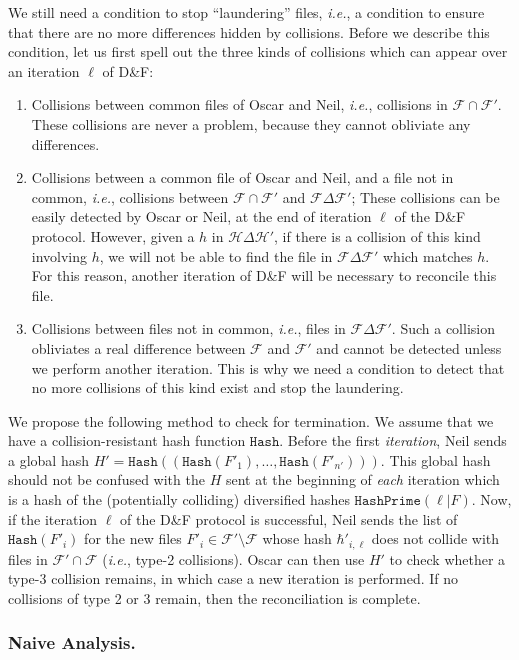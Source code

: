 \documentclass[11pt]{llncs}
\newcommand{\Set}{\mathcal{H}}
\newcommand{\Files}{\mathcal{F}}
\newcommand{\df}{D\&F\xspace}
\newcommand{\ie}{\textit{i.e.}\xspace}
\newcommand{\Hash}{\ensuremath{\mathtt{Hash}}}
\newcommand{\HashPrime}{\ensuremath{\mathtt{HashPrime}}}
\begin{document}
We still need a condition to stop ``laundering'' files, \ie, a condition to ensure that there are no more differences hidden by collisions.
Before we describe this condition, let us first spell out the three kinds of collisions which can appear over an iteration $\ell$ of \df:

\begin{enumerate}
\item Collisions between common files of Oscar and Neil, \ie, collisions in $\Files \cap \Files'$. These collisions are never a problem, because they cannot obliviate any differences.
\item Collisions between a common file of Oscar and Neil, and a file not in common, \ie, collisions between $\Files \cap \Files'$ and $\Files \Delta \Files'$;
These collisions can be easily detected by Oscar or Neil, at the end of iteration $\ell$ of the \df protocol. 
However, given a $h$ in $\Set \Delta \Set'$, if there is a collision of this kind involving $h$, we will not be able to find the file in $\Files \Delta \Files'$ which matches $h$. For this reason, another iteration of \df will be necessary to reconcile this file.
\item Collisions between files not in common, \ie, files in $\Files \Delta \Files'$.
  Such a collision obliviates a real difference between $\Files$ and $\Files'$ and cannot be detected unless we perform another iteration. This is why we need a condition to detect that no more collisions of this kind exist and stop the laundering.
\end{enumerate}

We propose the following method to check for termination. We assume that we have a collision-resistant hash function $\Hash$.
Before the first \emph{iteration}, Neil sends a global hash $H' = \Hash((\Hash(F'_1),\dots,\Hash(F'_{n'})))$.
This global hash should not be confused with the $H$ sent at the beginning of \emph{each} iteration which is a hash of the (potentially colliding) diversified hashes $ \HashPrime(\ell|F)$.
Now, if the iteration $\ell$ of the \df protocol is successful, Neil sends the list of $\Hash(F'_i)$ for the new files $F'_i \in \Files' \setminus \Files$ whose hash $\hbar'_{i,\ell}$ does not collide with files in $\Files' \cap \Files$ (\ie, type-2 collisions).
Oscar can then use $H'$ to check whether a type-3 collision remains, in which case a new iteration is performed. If no collisions of type 2 or 3 remain, then the reconciliation is complete.

\subsubsection{Naive Analysis.}
\end{document}
